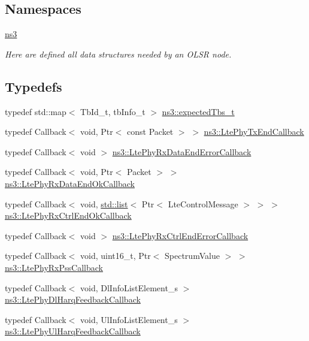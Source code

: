 \subsection*{Namespaces}
\begin{DoxyCompactItemize}
\item 
 \hyperlink{namespacens3}{ns3}
\begin{DoxyCompactList}\small\item\em Here are defined all data structures needed by an O\+L\+SR node. \end{DoxyCompactList}\end{DoxyCompactItemize}
\subsection*{Typedefs}
\begin{DoxyCompactItemize}
\item 
typedef std\+::map$<$ Tb\+Id\+\_\+t, tb\+Info\+\_\+t $>$ \hyperlink{namespacens3_a2657af5d5b5897d8e41530610fee1c0f}{ns3\+::expected\+Tbs\+\_\+t}
\item 
typedef Callback$<$ void, Ptr$<$ const Packet $>$ $>$ \hyperlink{namespacens3_a24fd770b1dd6581414512d03661ca44c}{ns3\+::\+Lte\+Phy\+Tx\+End\+Callback}
\item 
typedef Callback$<$ void $>$ \hyperlink{namespacens3_a7b967f2fed4d92f6ec8a607ac493c535}{ns3\+::\+Lte\+Phy\+Rx\+Data\+End\+Error\+Callback}
\item 
typedef Callback$<$ void, Ptr$<$ Packet $>$ $>$ \hyperlink{namespacens3_aeb73b95892e5c82bf5dd9e7f393ebc7a}{ns3\+::\+Lte\+Phy\+Rx\+Data\+End\+Ok\+Callback}
\item 
typedef Callback$<$ void, \hyperlink{openflow-interface_8h_afd9bcfa176617760671b67580f536fa7}{std\+::list}$<$ Ptr$<$ Lte\+Control\+Message $>$ $>$ $>$ \hyperlink{namespacens3_a75b47d60a00f06fe21b43f872bc22bb9}{ns3\+::\+Lte\+Phy\+Rx\+Ctrl\+End\+Ok\+Callback}
\item 
typedef Callback$<$ void $>$ \hyperlink{namespacens3_a097aded14de04bf7d1df0316fa68a175}{ns3\+::\+Lte\+Phy\+Rx\+Ctrl\+End\+Error\+Callback}
\item 
typedef Callback$<$ void, uint16\+\_\+t, Ptr$<$ Spectrum\+Value $>$ $>$ \hyperlink{namespacens3_a8ac519df0b71201cdd5848027df6d367}{ns3\+::\+Lte\+Phy\+Rx\+Pss\+Callback}
\item 
typedef Callback$<$ void, Dl\+Info\+List\+Element\+\_\+s $>$ \hyperlink{namespacens3_af03b82938a46f6bddebfb63ec3b0f93c}{ns3\+::\+Lte\+Phy\+Dl\+Harq\+Feedback\+Callback}
\item 
typedef Callback$<$ void, Ul\+Info\+List\+Element\+\_\+s $>$ \hyperlink{namespacens3_acc408d565410d696cf016f2d4ead8d2a}{ns3\+::\+Lte\+Phy\+Ul\+Harq\+Feedback\+Callback}
\end{DoxyCompactItemize}
